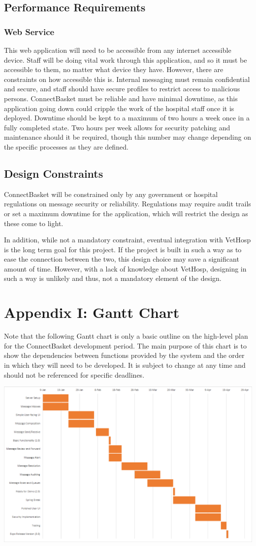 \documentclass[onecolumn, draftclsnofoot,10pt, compsoc]{IEEEtran}
\begin{document}
\subsection{Performance Requirements}

\subsubsection{Web Service}
This web application will need to be accessible from any internet accessible device. Staff will be doing vital work through this application, and so it must be accessible to them, no matter what device they have. However, there are constraints on how accessible this is. Internal messaging must remain confidential and secure, and staff should have secure profiles to restrict access to malicious persons. ConnectBasket must be reliable and have minimal downtime, as this application going down could cripple the work of the hospital staff once it is deployed. Downtime should be kept to a maximum of two hours a week once in a fully completed state. Two hours per week allows for security patching and maintenance should it be required, though this number may change depending on the specific processes as they are defined.

\subsection{Design Constraints}
ConnectBasket will be constrained only by any government or hospital regulations on message security or reliability. Regulations may require audit trails or set a maximum downtime for the application, which will restrict the design as these come to light.

In addition, while not a mandatory constraint, eventual integration with VetHosp is the long term goal for this project. If the project is built in such a way as to ease the connection between the two, this design choice may save a significant amount of time. However, with a lack of knowledge about VetHosp, designing in such a way is unlikely and thus, not a mandatory element of the design.
\newpage
\section{Appendix I: Gantt Chart}
Note that the following Gantt chart is only a basic outline on the high-level plan for the ConnectBasket development period. The main purpose of this chart is to show the dependencies between functions provided by the system and the order in which they will need to be developed. It is subject to change at any time and should not be referenced for specific deadlines.

\includegraphics[angle=-90,origin=c,width=\textwidth,height=\textheight,keepaspectratio]{gantt-chart.eps}
\end{document}
